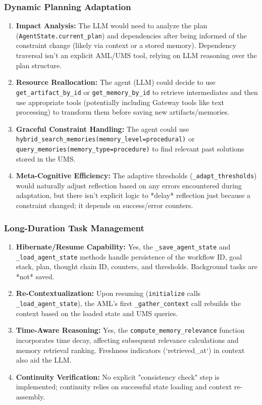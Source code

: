\documentclass[12pt,a4paper]{article}
\newcommand{\code}[1]{\nolinkurl{#1}}
\begin{document}
\subsubsection{Dynamic Planning Adaptation}
\begin{enumerate}
    \item \textbf{Impact Analysis:} The LLM would need to analyze the plan (\code{AgentState.current\_plan}) and dependencies after being informed of the constraint change (likely via context or a stored memory). Dependency traversal isn't an explicit AML/UMS tool, relying on LLM reasoning over the plan structure.
    \item \textbf{Resource Reallocation:} The agent (LLM) could decide to use \code{get\_artifact\_by\_id} or \code{get\_memory\_by\_id} to retrieve intermediates and then use appropriate tools (potentially including Gateway tools like text processing) to transform them before saving new artifacts/memories.
    \item \textbf{Graceful Constraint Handling:} The agent could use \code{hybrid\_search\_memories(memory\_level=procedural)} or \code{query\_memories(memory\_type=procedure)} to find relevant past solutions stored in the UMS.
    \item \textbf{Meta-Cognitive Efficiency:} The adaptive thresholds (\code{\_adapt\_thresholds}) would naturally adjust reflection based on any errors encountered during adaptation, but there isn't explicit logic to *delay* reflection just because a constraint changed; it depends on success/error counters.
\end{enumerate}

\subsubsection{Long-Duration Task Management}
\begin{enumerate}
    \item \textbf{Hibernate/Resume Capability:} Yes, the \code{\_save\_agent\_state} and \code{\_load\_agent\_state} methods handle persistence of the workflow ID, goal stack, plan, thought chain ID, counters, and thresholds. Background tasks are *not* saved.
    \item \textbf{Re-Contextualization:} Upon resuming (\code{initialize} calls \code{\_load\_agent\_state}), the AML's first \code{\_gather\_context} call rebuilds the context based on the loaded state and UMS queries.
    \item \textbf{Time-Aware Reasoning:} Yes, the \code{compute\_memory\_relevance} function incorporates time decay, affecting subsequent relevance calculations and memory retrieval ranking. Freshness indicators (`retrieved\_at`) in context also aid the LLM.
    \item \textbf{Continuity Verification:} No explicit "consistency check" step is implemented; continuity relies on successful state loading and context re-assembly.
\end{enumerate}


\printbibliography


\end{document}

